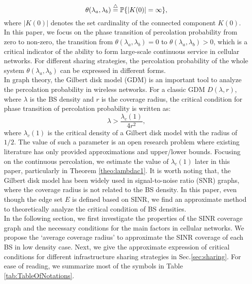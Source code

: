 \documentclass[final]{IEEEtran}
\begin{document}
\begin{equation}\label{perprodef}
    \theta(\lambda_a,\lambda_b)\overset{\triangle}{=}{\P}\{|K(0)|=\infty\},
\end{equation}
where $|K(0)|$ denotes the set cardinality of the connected component $K(0)$. In this paper, we focus on the phase transition of percolation probability from zero to non-zero, \ie the transition from $\theta(\lambda_a,\lambda_b)=0$ to $\theta(\lambda_a,\lambda_b)>0$, which is a critical indicator of the ability to form large-scale continuous service in cellular networks. For different sharing strategies, the percolation probability of the whole system $\theta(\lambda_a,\lambda_b)$ can be expressed in different forms.\\
\indent In graph theory, the Gilbert disk model (GDM) is an important tool to analyze the percolation probability in wireless networks. For a classic GDM $D(\lambda,r)$, where $\lambda$ is the BS density and $r$ is the coverage radius, the critical condition for phase transition of percolation probability is written as: \\
\begin{equation}\label{GDMcricon}
    \lambda>\frac{\lambda_c(1)}{4r^2},
\end{equation}
where $\lambda_c(1)$ is the critical density of a Gilbert disk model with the radius of $1/2$. The value of such a parameter is an open research problem where existing literature has only provided approximations and upper/lower bounds. Focusing on the continuous percolation, we estimate the value of $\lambda_c(1)$ later in this paper, particularly in Theorem \ref{theo:lambdac1}. It is worth noting that, the Gilbert disk model has been widely used in signal-to-noise ratio (SNR) graphs, where the coverage radius is not related to the BS density. In this paper, even though the edge set $E$ is defined based on SINR, we find an approximate method to theoretically analyze the critical condition of BS densities.  \\
\indent In the following section, we first investigate the properties of the SINR coverage graph and the necessary conditions for the main factors in cellular networks. We propose the `average coverage radius' to approximate the SINR coverage of each BS in low density case. Next, we give the approximate expression of critical conditions for different infrastructure sharing strategies in Sec.\ref{sec:sharing}. For ease of reading, we summarize most of the symbols in Table \ref{tab:TableOfNotations}.
\end{document}
